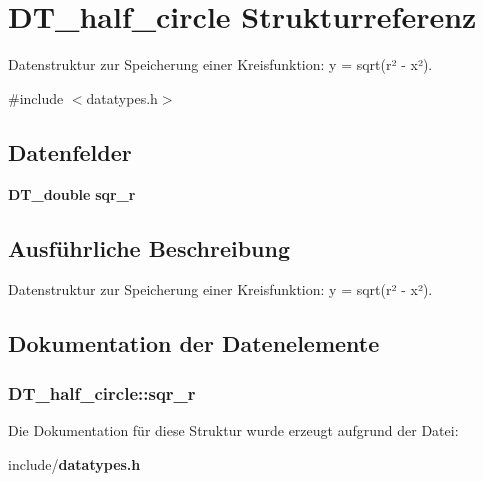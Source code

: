 \section{DT\_\-half\_\-circle Strukturreferenz}
\label{struct_d_t__half__circle}


Datenstruktur zur Speicherung einer Kreisfunktion: y = sqrt(r² -\/ x²).  




{\ttfamily \#include $<$datatypes.h$>$}

\subsection*{Datenfelder}
\begin{DoxyCompactItemize}
\item 
{\bf DT\_\-double} {\bf sqr\_\-r}
\end{DoxyCompactItemize}


\subsection{Ausführliche Beschreibung}
Datenstruktur zur Speicherung einer Kreisfunktion: y = sqrt(r² -\/ x²). 

\subsection{Dokumentation der Datenelemente}
\subsubsection[{sqr\_\-r}]{ {\bf DT\_\-half\_\-circle::sqr\_\-r}}\label{struct_d_t__half__circle_a920b3fd98222a3b7616d41fab27a3e34}


Die Dokumentation für diese Struktur wurde erzeugt aufgrund der Datei:\begin{DoxyCompactItemize}
\item 
include/{\bf datatypes.h}\end{DoxyCompactItemize}
